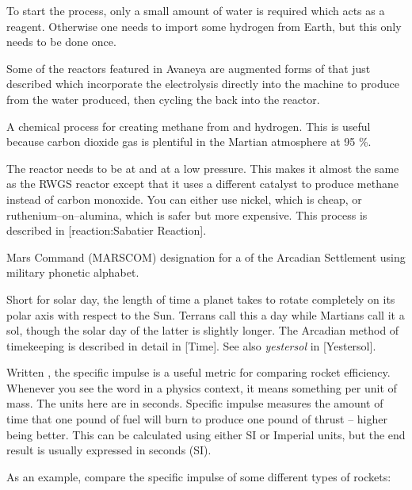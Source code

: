 To start the process, only a small amount of water is required which acts as a reagent. Otherwise one needs to import some hydrogen from Earth, but this only needs to be done once.

Some of the reactors featured in Avaneya are augmented forms of that just described which incorporate the electrolysis directly into the machine to produce  from the water produced, then cycling the  back into the reactor.

A chemical process for creating methane  from  and hydrogen. This is useful because carbon dioxide gas is plentiful in the Martian atmosphere at 95 \%.

\startformula
{}
\stopformula

The reactor needs to be at  and at a low pressure. This makes it almost the same as the RWGS reactor except that it uses a different catalyst to produce methane instead of carbon monoxide. You can either use nickel, which is cheap, or ruthenium--on--alumina, which is safer but more expensive. This process is described in [reaction:Sabatier Reaction].

Mars Command (MARSCOM) designation for a  of the Arcadian Settlement using military phonetic alphabet.

Short for solar day, the length of time a planet takes to rotate completely on its polar axis with respect to the Sun. Terrans call this a day while Martians call it a sol, though the solar day of the latter is slightly longer. The Arcadian method of timekeeping is described in detail in [Time]. See also {\it yestersol} in [Yestersol]. 

Written , the specific impulse is a useful metric for comparing rocket efficiency. Whenever you see the word  in a physics context, it means something per unit of mass. The units here are in seconds. Specific impulse measures the amount of time that one pound of fuel will burn to produce one pound of thrust -- higher being better. This can be calculated using either SI or Imperial units, but the end result is usually expressed in seconds (SI).

As an example, compare the specific impulse of some different types of rockets:
\crlf
\crlf

